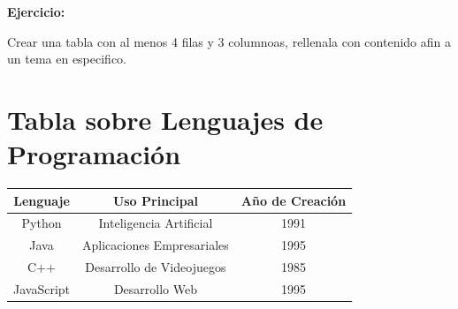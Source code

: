\documentclass[12pts]{article}
\newenvironment{ejercicio}
{
\vspace{0.3cm}
\noindent\textbf{Ejercicio:}
\begin{itshape}%
}
{
\end{itshape}
\vspace{0.3}
}
\begin{document}
\begin{ejercicio}
    Crear una tabla con al menos 4 filas y 3 columnoas, rellenala con contenido afin a un tema en especifico.

\end{ejercicio}

\section*{Tabla sobre Lenguajes de Programación}

\begin{center}
\begin{tabular}{|c|c|c|}
\hline
\textbf{Lenguaje} & \textbf{Uso Principal} & \textbf{Año de Creación} \\
\hline
Python & Inteligencia Artificial & 1991 \\
\hline
Java & Aplicaciones Empresariales & 1995 \\
\hline
C++ & Desarrollo de Videojuegos & 1985 \\
\hline
JavaScript & Desarrollo Web & 1995 \\
\hline
\end{tabular}
\end{center}
\end{document}
